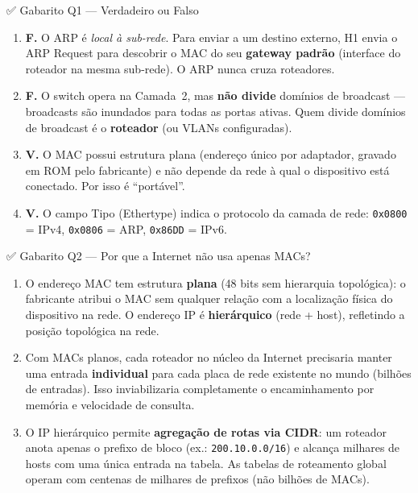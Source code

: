 \documentclass[11pt,a4paper]{article}
\begin{document}
\begin{gabaritocaixa}{✅ Gabarito Q1 --- Verdadeiro ou Falso}
\begin{enumerate}[label=(\alph*)]
    \item \textbf{F.} O ARP é \emph{local à sub-rede}. Para enviar a um destino externo, H1 envia o ARP Request para descobrir o MAC do seu \textbf{gateway padrão} (interface do roteador na mesma sub-rede). O ARP nunca cruza roteadores.
    \item \textbf{F.} O switch opera na Camada~2, mas \textbf{não divide} domínios de broadcast --- broadcasts são inundados para todas as portas ativas. Quem divide domínios de broadcast é o \textbf{roteador} (ou VLANs configuradas).
    \item \textbf{V.} O MAC possui estrutura plana (endereço único por adaptador, gravado em ROM pelo fabricante) e não depende da rede à qual o dispositivo está conectado. Por isso é ``portável''.
    \item \textbf{V.} O campo Tipo (Ethertype) indica o protocolo da camada de rede: \texttt{0x0800} = IPv4, \texttt{0x0806} = ARP, \texttt{0x86DD} = IPv6.
\end{enumerate}
\end{gabaritocaixa}

\begin{gabaritocaixa}{✅ Gabarito Q2 --- Por que a Internet não usa apenas MACs?}
\begin{enumerate}[label=(\alph*)]
    \item O endereço MAC tem estrutura \textbf{plana} (48 bits sem hierarquia topológica): o fabricante atribui o MAC sem qualquer relação com a localização física do dispositivo na rede. O endereço IP é \textbf{hierárquico} (rede + host), refletindo a posição topológica na rede.
    \item Com MACs planos, cada roteador no núcleo da Internet precisaria manter uma entrada \textbf{individual} para cada placa de rede existente no mundo (bilhões de entradas). Isso inviabilizaria completamente o encaminhamento por memória e velocidade de consulta.
    \item O IP hierárquico permite \textbf{agregação de rotas via CIDR}: um roteador anota apenas o prefixo de bloco (ex.: \texttt{200.10.0.0/16}) e alcança milhares de hosts com uma única entrada na tabela. As tabelas de roteamento global operam com centenas de milhares de prefixos (não bilhões de MACs).
\end{enumerate}
\end{gabaritocaixa}
\end{document}
